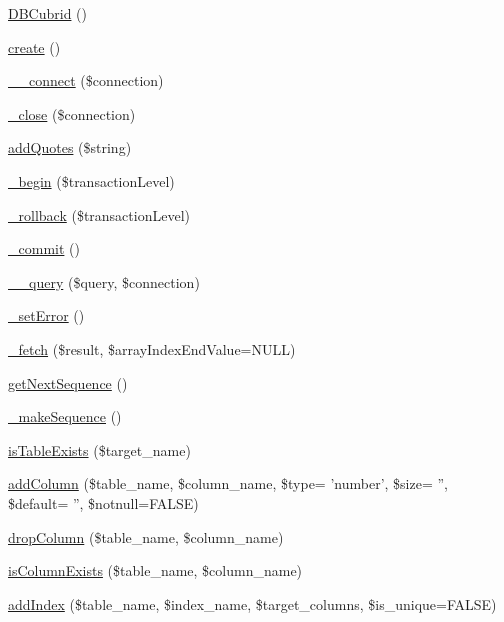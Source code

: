 \begin{DoxyCompactItemize}
\item 
\hyperlink{classDBCubrid_ad17912f5a76c00f761e32178f634581e}{D\+B\+Cubrid} ()
\item 
\hyperlink{classDBCubrid_a9a5f425a0abce46d33a6d713b7dd407f}{create} ()
\item 
\hyperlink{classDBCubrid_aa0798dadf20548b2c38e925f391c72f2}{\+\_\+\+\_\+connect} (\$connection)
\item 
\hyperlink{classDBCubrid_ab1a7b718fc864d7b5992cd99abfe2690}{\+\_\+close} (\$connection)
\item 
\hyperlink{classDBCubrid_ab9aea745152a86b3852101aa3225f26d}{add\+Quotes} (\$string)
\item 
\hyperlink{classDBCubrid_a9d1c4b0ff2003c9e1ef843fbb238616d}{\+\_\+begin} (\$transaction\+Level)
\item 
\hyperlink{classDBCubrid_affb82895449542c9375e12cc0558a2cd}{\+\_\+rollback} (\$transaction\+Level)
\item 
\hyperlink{classDBCubrid_ac8cce69fb6939b2383eb03214ff2522b}{\+\_\+commit} ()
\item 
\hyperlink{classDBCubrid_a2319e8c887147d9596e096088ff67c6a}{\+\_\+\+\_\+query} (\$query, \$connection)
\item 
\hyperlink{classDBCubrid_aaf7dd65f4cdfea9903ab641163058936}{\+\_\+set\+Error} ()
\item 
\hyperlink{classDBCubrid_abb95044521be20a8b2ba105ab623b4d9}{\+\_\+fetch} (\$result, \$array\+Index\+End\+Value=N\+U\+L\+L)
\item 
\hyperlink{classDBCubrid_a56780e480de62dfca8d67c7bccb4791c}{get\+Next\+Sequence} ()
\item 
\hyperlink{classDBCubrid_ac91bfc1859aaeb1a8d7a58e56829d4de}{\+\_\+make\+Sequence} ()
\item 
\hyperlink{classDBCubrid_aa88914b97476deb6c292a44bff2f2f40}{is\+Table\+Exists} (\$target\+\_\+name)
\item 
\hyperlink{classDBCubrid_ab06037303de4dd1eee7ca846e8abdc7d}{add\+Column} (\$table\+\_\+name, \$column\+\_\+name, \$type= 'number', \$size= '', \$default= '', \$notnull=F\+A\+L\+S\+E)
\item 
\hyperlink{classDBCubrid_ad0b269d73617c6de8b3135ee36ae43d2}{drop\+Column} (\$table\+\_\+name, \$column\+\_\+name)
\item 
\hyperlink{classDBCubrid_a76c8d9dd51a3e64f18b8d1f4da318ac7}{is\+Column\+Exists} (\$table\+\_\+name, \$column\+\_\+name)
\item 
\hyperlink{classDBCubrid_a57c81b55423f07caa0c021229c7ffa07}{add\+Index} (\$table\+\_\+name, \$index\+\_\+name, \$target\+\_\+columns, \$is\+\_\+unique=F\+A\+L\+S\+E)

\end{DoxyCompactItemize}
